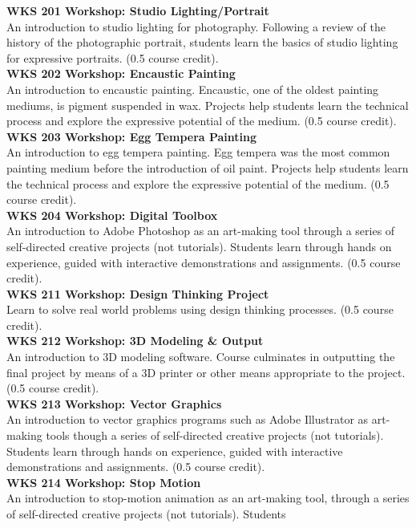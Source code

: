 \documentclass[
  letterpaper,
]{scrbook}
\begin{document}
\textbf{WKS 201 Workshop: Studio Lighting/Portrait}\\
An introduction to studio lighting for photography. Following a review
of the history of the photographic portrait, students learn the basics
of studio lighting for expressive portraits. (0.5 course credit).\\
\textbf{WKS 202 Workshop: Encaustic Painting}\\
An introduction to encaustic painting. Encaustic, one of the oldest
painting mediums, is pigment suspended in wax. Projects help students
learn the technical process and explore the expressive potential of the
medium. (0.5 course credit).\\
\textbf{WKS 203 Workshop: Egg Tempera Painting}\\
An introduction to egg tempera painting. Egg tempera was the most common
painting medium before the introduction of oil paint. Projects help
students learn the technical process and explore the expressive
potential of the medium. (0.5 course credit).\\
\textbf{WKS 204 Workshop: Digital Toolbox}\\
An introduction to Adobe Photoshop as an art-making tool through a
series of self-directed creative projects (not tutorials). Students
learn through hands on experience, guided with interactive
demonstrations and assignments. (0.5 course credit).\\
\textbf{WKS 211 Workshop: Design Thinking Project}\\
Learn to solve real world problems using design thinking processes. (0.5
course credit).\\
\textbf{WKS 212 Workshop: 3D Modeling \& Output}\\
An introduction to 3D modeling software. Course culminates in outputting
the final project by means of a 3D printer or other means appropriate to
the project. (0.5 course credit).\\
\textbf{WKS 213 Workshop: Vector Graphics}\\
An introduction to vector graphics programs such as Adobe Illustrator as
art-making tools though a series of self-directed creative projects (not
tutorials). Students learn through hands on experience, guided with
interactive demonstrations and assignments. (0.5 course credit).\\
\textbf{WKS 214 Workshop: Stop Motion}\\
An introduction to stop-motion animation as an art-making tool, through
a series of self-directed creative projects (not tutorials). Students
\end{document}
